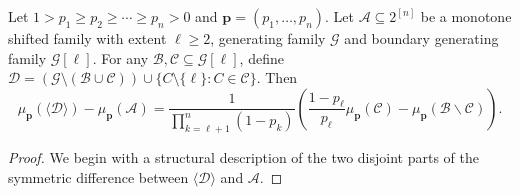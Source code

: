 \documentclass[10pt,a4paper]{amsart}
\begin{document}
\begin{lemma}\label{le2}
Let $1 > p_1 \ge p_2 \ge \cdots \ge p_n > 0$ and $\mathbf{p} = (p_1, \dots, p_n)$.
Let $\mathcal{A}\subseteq 2^{[n]}$ be a monotone shifted family with extent $\ell\geq 2$, generating family $\mathcal{G}$ and boundary generating family $\mathcal{G}[\ell]$.  For any $\mathcal{B},\mathcal{C}\subseteq \mathcal{G}[\ell]$, define $\mathcal{D}=(\mathcal{G}\setminus(\mathcal{B}\cup\mathcal{C}) 
)\cup\{C\setminus\{\ell\}: C\in\mathcal{C}\}$.  Then
$$
\mu_{\mathbf{p}}(\langle \mathcal{D} \rangle) - \mu_{\mathbf{p}}(\mathcal{A})
=
\frac{1}{\prod_{k=\ell+1}^n (1-p_k)} \left(
\frac{1-p_\ell}{p_\ell}  \mu_{\mathbf{p}}( \mathcal{C}) - \mu_{\mathbf{p}}( \mathcal{B}\backslash \mathcal{C} )
\right).
$$
\end{lemma}

\begin{proof}
We begin with a structural description of the two disjoint parts of the symmetric difference between $\langle\mathcal{D}\rangle$ and $\mathcal{A}$. 


\end{proof}
\end{document}
